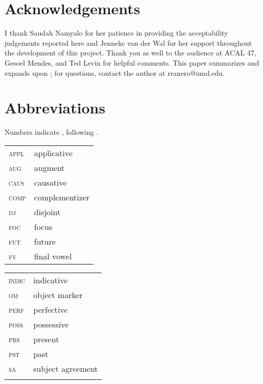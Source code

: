 \documentclass[output=paper,newtxmath,modfonts,nonflat,hidelinks]{langsci/langscibook}
\begin{document}
\section*{Acknowledgements}

I thank Saudah Namyalo for her patience in providing the acceptability judgements reported here and Jenneke van der Wal for her support throughout the development of this project. Thank you as well to the audience at ACAL 47, Gesoel Mendes, and Ted Levin for helpful comments. This paper summarizes and expands upon \citet{ranero2015}; for questions, contact the author at rranero@umd.edu.

\section*{Abbreviations}

Numbers indicate  , following \citet{Hyman1990}.\medskip

\noindent
\begin{tabularx}{.45\textwidth}{lQ}
\textsc{appl} & applicative\\
\textsc{aug} & augment \\
\textsc{caus} & causative \\
\textsc{comp} & complementizer \\
\textsc{dj} &  {disjoint}\\
\textsc{foc} &  {focus}\\
\textsc{fut} & future\\
\textsc{fv} &  {final vowel}\\
\end{tabularx}
\begin{tabularx}{.45\textwidth}{lQ}
\textsc{indic} & indicative\\
\textsc{om} &  {object marker}\\
\textsc{perf} & perfective\\
\textsc{poss} & possessive\\
\textsc{prs} & present\\
\textsc{pst} & past\\
\textsc{sa} &  {subject agreement} \\
\\
\end{tabularx}

\sloppy
\printbibliography[heading=subbibliography,notkeyword=this]
\end{document}
